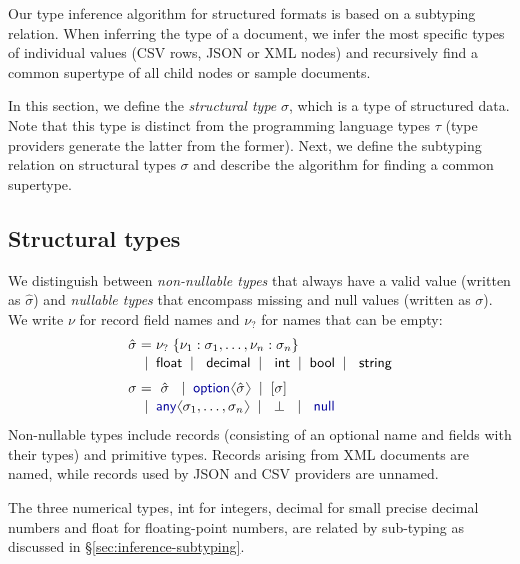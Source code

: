 \documentclass[10pt,preprint,clearpagebib]{sigplanconf}
\newcommand{\langl}{\begin{picture}(4.5,7)
\put(1.1,2.5){\rotatebox{60}{\line(1,0){5.5}}}
\put(1.1,2.5){\rotatebox{300}{\line(1,0){5.5}}}
\end{picture}}
\newcommand{\rangl}{\begin{picture}(4.5,7)
\put(.9,2.5){\rotatebox{120}{\line(1,0){5.5}}}
\put(.9,2.5){\rotatebox{240}{\line(1,0){5.5}}}
\end{picture}}
\newcommand{\kvd}[1]{\textnormal{\textcolor{kvdclr}{\sffamily #1}}}
\newcommand{\ident}[1]{\textnormal{\sffamily #1}}
\newcommand{\lsep}[0]{\;\; | \;\;}
\newcommand{\narrow}[1]{\hspace{-0.7em} #1 \hspace{-0.7em}}
\begin{document}
Our type inference algorithm for structured formats is based on a subtyping relation. When 
inferring the type of a document, we infer the most specific types of individual values (CSV rows,
JSON or XML nodes) and recursively find a common supertype of all child nodes or sample documents.

In this section, we define the \emph{structural type} $\sigma$, which is a type of structured data.
Note that this type is distinct from the programming language types $\tau$ (type providers generate 
the latter from the former). Next, we define the subtyping relation on structural types $\sigma$ and 
describe the algorithm for finding a common supertype. 

\subsection{Structural types}
\label{sec:inference-types}

We distinguish between \emph{non-nullable types} that always have a valid value (written as 
$\hat{\sigma}$) and \emph{nullable types} that encompass missing and \kvd{null} values 
(written as $\sigma$). We write $\nu$ for record field names and $\nu_?$ for names that can be empty:
%
\begin{equation*}
\begin{array}{rcl}
 \hat{\sigma} &\narrow{=}& \nu_?\; \{ \nu_1 : \sigma_1, \ldots, \nu_n : \sigma_n \} \\[0.1em]
                &\narrow{|}& \ident{float} \lsep \ident{decimal} \lsep \ident{int} \lsep \ident{bool} \lsep \ident{string} 
 \\[0.6em] 
       \sigma &\narrow{=}& ~\hat{\sigma}~ \lsep \kvd{option}\langl \hat{\sigma} \rangl \lsep [\sigma] \\[0.1em]
              &\narrow{|}& \kvd{any}\langl\sigma_1, \ldots, \sigma_n\rangl \lsep ~\bot~ \lsep \kvd{null}
\end{array}
\end{equation*}
%
Non-nullable types include records (consisting of an optional name and fields with their types) 
and primitive types. Records arising from XML documents are named, while records used by 
JSON and CSV providers are unnamed. 

The three numerical types, \ident{int} for integers, \ident{decimal} for small precise decimal 
numbers and \ident{float} for floating-point numbers, are related by sub-typing as discussed in 
\S\ref{sec:inference-subtyping}.
\end{document}
